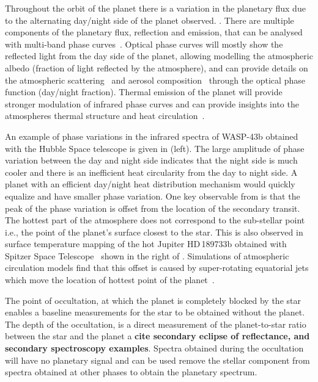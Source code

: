 Throughout the orbit of the planet there is a variation in the planetary flux due to the alternating day/night side of the planet observed. .
There are multiple components of the planetary flux, reflection and emission, that can be analysed with multi-band phase curves~\citep[e.g.][]{knutson_characterizing_2009, esteves_optical_2013}. Optical phase curves will mostly show the reflected light from the day side of the planet, allowing modelling the atmospheric albedo (fraction of light reflected by the atmosphere), and can provide details on the atmospheric scattering~\citep{madhusudhan_analytic_2012} and aerosol composition~\citep{oreshenko_optical_2016} through the optical phase function (day/night fraction). Thermal emission of the planet will provide stronger modulation of infrared phase curves and can provide insights into the atmospheres thermal
structure and heat circulation~\citep{ goodman_thermodynamics_2009, koll_temperature_2016}.

An example of phase variations in the infrared spectra of {WASP-43b} obtained with the Hubble Space telescope is given in  (left). The large amplitude of phase variation between the day and night side indicates that the night side is much cooler and there is an inefficient heat circularity from the day to night side. A planet with an efficient day/night heat distribution mechanism would quickly equalize and have smaller phase variation. One key observable from  is that the peak of the phase variation is offset from the location of the secondary transit. The hottest part of the atmosphere does not correspond to the sub-stellar point i.e., the point of the planet's surface closest to the star. This is also observed in surface temperature mapping of the hot Jupiter HD\,189733b obtained with {Spitzer Space Telescope}~\citep{knutson_map_2007} shown in the right of . Simulations of atmospheric circulation models find that this offset is caused by super-rotating equatorial jets which move the location of hottest point of the planet~\citep[e.g.][and references therein]{heng_atmospheric_2015}.

The point of occultation, at which the planet is completely blocked by the star enables a baseline measurements for the star to be obtained without the planet. The depth of the occultation, is a direct measurement of the planet-to-star ratio between the star and the planet a \textbf{{cite secondary eclipse of reflectance, and secondary spectroscopy examples}}. Spectra obtained during the occultation will have no planetary signal and can be used remove the stellar component from spectra obtained at other phases to obtain the planetary spectrum.


